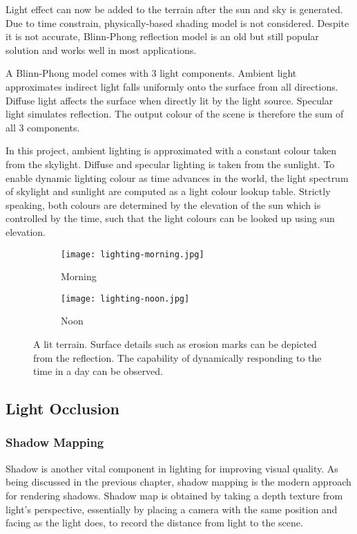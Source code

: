 \documentclass[oneside, a4paper]{report}
\begin{document}
    Light effect can now be added to the terrain after the sun and sky is generated. Due to time constrain, physically-based shading model is not considered. Despite it is not accurate, Blinn-Phong reflection model \cite{bp_shading} is an old but still popular solution and works well in most applications.

    A Blinn-Phong model comes with 3 light components. Ambient light approximates indirect light falls uniformly onto the surface from all directions. Diffuse light affects the surface when directly lit by the light source. Specular light simulates reflection. The output colour of the scene is therefore the sum of all 3 components.

    In this project, ambient lighting is approximated with a constant colour taken from the skylight. Diffuse and specular lighting is taken from the sunlight. To enable dynamic lighting colour as time advances in the world, the light spectrum of skylight and sunlight are computed as a light colour lookup table. Strictly speaking, both colours are determined by the elevation of the sun which is controlled by the time, such that the light colours can be looked up using sun elevation.

    \begin{figure}[H]
        \begin{subfigure}{0.48\textwidth}
            \texttt{[image: lighting-morning.jpg]}
            \caption{Morning}
        \end{subfigure}
        \begin{subfigure}{0.48\textwidth}
            \texttt{[image: lighting-noon.jpg]}
            \caption{Noon}
        \end{subfigure}
        \caption{A lit terrain. Surface details such as erosion marks can be depicted from the reflection. The capability of dynamically responding to the time in a day can be observed.}
    \end{figure}

    \subsection{Light Occlusion}

    \subsubsection{Shadow Mapping}

    Shadow is another vital component in lighting for improving visual quality. As being discussed in the previous chapter, shadow mapping is the modern approach for rendering shadows. Shadow map is obtained by taking a depth texture from light's perspective, essentially by placing a camera with the same position and facing as the light does, to record the distance from light to the scene.
\end{document}

